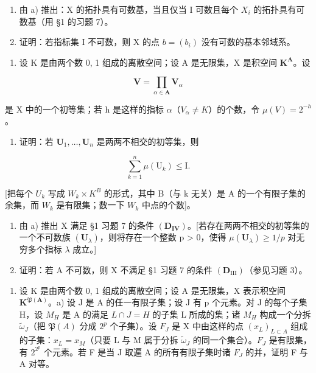 \begin{enumerate}
\def\labelenumi{\alph{enumi})}
\setcounter{enumi}{1}
\item
  由 a) 推出：X 的拓扑具有可数基，当且仅当 I 可数且每个 \(X_{i}\) 的拓扑具有可数基（用 §1 的习题 7）。
\item
  证明：若指标集 I 不可数，则 X 的点 \(b = (b_{i})\) 没有可数的基本邻域系。
\end{enumerate}

\begin{enumerate}
\def\labelenumi{\arabic{enumi})}
\setcounter{enumi}{3}
\tightlist
\item
  设 K 是由两个数 0, 1 组成的离散空间；设 A 是无限集，X 是积空间 \(\mathbf{K}^{\mathbf{A}}\)。设
\end{enumerate}

\[
\mathbf {V} = \prod_ {\alpha \in \mathbf {A}} \mathbf {V} _ {\alpha}
\]

是 X 中的一个初等集；若 h 是这样的指标 \(\alpha\)（\(V_{\alpha} \neq K\)）的个数，令 \(\mu(V) = 2^{-h}\)。

\begin{enumerate}
\def\labelenumi{\alph{enumi})}
\tightlist
\item
  证明：若 \(\mathbf{U}_1, \ldots, \mathbf{U}_n\) 是两两不相交的初等集，则
\end{enumerate}

\[
\sum_ {k = 1} ^ {n} \mu (\mathrm{U} _ {k}) \leqslant \mathrm{I}.
\]

{[}把每个 \(U_{k}\) 写成 \(W_{k} \times K^{B}\) 的形式，其中 B（与 k 无关）是 A 的一个有限子集的余集，而 \(W_{k}\) 是有限集；数一下 \(W_{k}\) 中点的个数{]}。

\begin{enumerate}
\def\labelenumi{\alph{enumi})}
\setcounter{enumi}{1}
\item
  由 a) 推出 X 满足 §1 习题 7 的条件 \((\mathbf{D}_{\mathbf{IV}})\)。{[}若存在两两不相交的初等集的一个不可数族 \((\mathbf{U}_{\lambda})\)，则将存在一个整数 p \textgreater{} 0，使得 \(\mu(\mathbf{U}_{\lambda}) \geqslant 1/p\) 对无穷多个指标 \(\lambda\) 成立。{]}
\item
  证明：若 A 不可数，则 X 不满足 §1 习题 7 的条件 \((\mathbf{D}_{\mathrm{III}})\)（参见习题 3）。
\end{enumerate}

\begin{enumerate}
\def\labelenumi{\arabic{enumi})}
\setcounter{enumi}{4}
\tightlist
\item
  设 K 是由两个数 0, 1 组成的离散空间；设 A 是无限集，X 表示积空间 \(\mathbf{K}^{\mathfrak{P}(\mathbf{A})}\)。a) 设 J 是 A 的任一有限子集；设 J 有 p 个元素。对 J 的每个子集 H，设 \(M_{H}\) 是 A 的满足 \(L \cap J = H\) 的子集 L 所成的集；诸 \(M_{H}\) 构成一个分拆 \(\tilde{\omega}_{J}\)（把 \(\mathfrak{P}(A)\) 分成 \(2^{p}\) 个子集）。设 \(F_{J}\) 是 X 中由这样的点 \((x_{L})_{L \subset A}\) 组成的子集：\(x_{L} = x_{M}\)（只要 L 与 M 属于分拆 \(\tilde{\omega}_{J}\) 的同一个集合）。\(F_{J}\) 是有限集，有 \(2^{2^{p}}\) 个元素。若 F 是当 J 取遍 A 的所有有限子集时诸 \(F_{J}\) 的并，证明 F 与 A 对等。
\end{enumerate}

